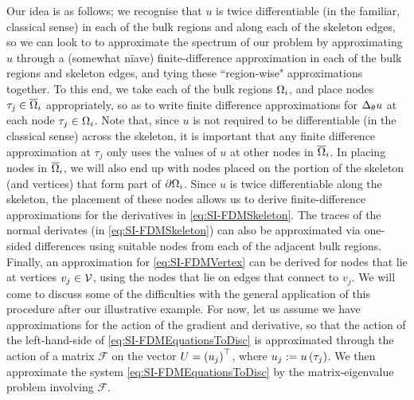 Our idea is as follows; we recognise that $u$ is twice differentiable (in the familiar, classical sense) in each of the bulk regions and along each of the skeleton edges, so we can look to to approximate the spectrum of our problem by approximating $u$ through a (somewhat n{\"i}ave) finite-difference approximation in each of the bulk regions and skeleton edges, and tying these ``region-wise" approximations together.
To this end, we take each of the bulk regions $\Omega_i$, and place nodes $\tau_j\in\overline{\Omega}_{i}$ appropriately, so as to write finite difference approximations for $\Delta_{\theta}u$ at each node $\tau_j\in\Omega_i$.
Note that, since $u$ is not required to be differentiable (in the classical sense) across the skeleton, it is important that any finite difference approximation at $\tau_j$ only uses the values of $u$ at other nodes in $\overline{\Omega}_{i}$.
In placing nodes in $\overline{\Omega}_{i}$, we will also end up with nodes placed on the portion of the skeleton (and vertices) that form part of $\partial\Omega_i$.
Since $u$ is twice differentiable along the skeleton, the placement of these nodes allows us to derive finite-difference approximations for the derivatives in \eqref{eq:SI-FDMSkeleton}.
The traces of the normal derivates (in \eqref{eq:SI-FDMSkeleton}) can also be approximated via one-sided differences using suitable nodes from each of the adjacent bulk regions.
Finally, an approximation for \eqref{eq:SI-FDMVertex} can be derived for nodes that lie at vertices $v_j\in\mathcal{V}$, using the nodes that lie on edges that connect to $v_j$.
We will come to discuss some of the difficulties with the general application of this procedure after our illustrative example.
For now, let us assume we have approximations for the action of the gradient and derivative, so that the action of the left-hand-side of \eqref{eq:SI-FDMEquationsToDisc} is approximated through the action of a matrix $\mathcal{F}$ on the vector $U = \left( u_j \right)^\top$, where $u_j:=u\left( \tau_j \right)$.
We then approximate the system \eqref{eq:SI-FDMEquationsToDisc} by the matrix-eigenvalue problem involving $\mathcal{F}$.

